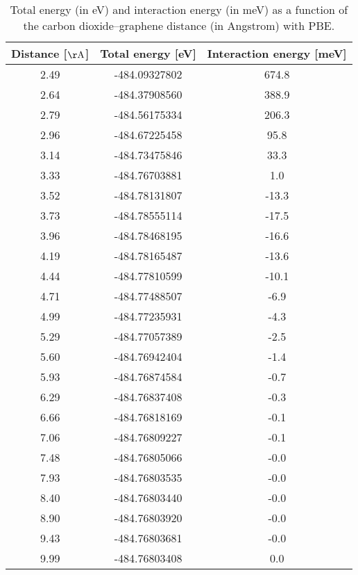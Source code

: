 \begin{table}[h]
\centering
\begin{tabular}{ccc}
\hline
Distance [$\mathrm{\AA}$] & Total energy [eV] & Interaction energy [meV] \\
\hline
2.49 & -484.09327802 & 674.8 \\
2.64 & -484.37908560 & 388.9 \\
2.79 & -484.56175334 & 206.3 \\
2.96 & -484.67225458 & 95.8 \\
3.14 & -484.73475846 & 33.3 \\
3.33 & -484.76703881 & 1.0 \\
3.52 & -484.78131807 & -13.3 \\
3.73 & -484.78555114 & -17.5 \\
3.96 & -484.78468195 & -16.6 \\
4.19 & -484.78165487 & -13.6 \\
4.44 & -484.77810599 & -10.1 \\
4.71 & -484.77488507 & -6.9 \\
4.99 & -484.77235931 & -4.3 \\
5.29 & -484.77057389 & -2.5 \\
5.60 & -484.76942404 & -1.4 \\
5.93 & -484.76874584 & -0.7 \\
6.29 & -484.76837408 & -0.3 \\
6.66 & -484.76818169 & -0.1 \\
7.06 & -484.76809227 & -0.1 \\
7.48 & -484.76805066 & -0.0 \\
7.93 & -484.76803535 & -0.0 \\
8.40 & -484.76803440 & -0.0 \\
8.90 & -484.76803920 & -0.0 \\
9.43 & -484.76803681 & -0.0 \\
9.99 & -484.76803408 & 0.0 \\
\hline
\end{tabular}
\caption{Total energy (in eV) and interaction energy (in meV) as a function of the carbon dioxide--graphene distance (in Angstrom) with PBE.}
\label{SI_dft_table_PBE}
\end{table}